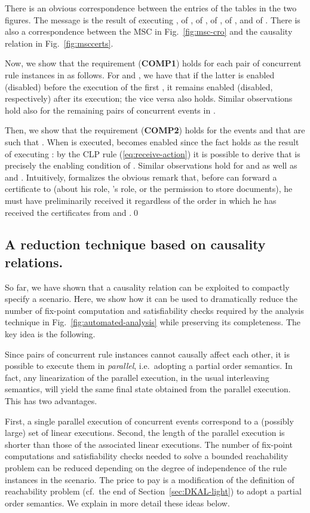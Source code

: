 \documentclass[conference]{llncs}
\begin{document}
{\begin{example}
There is an obvious correspondence between
the entries of the tables in the two figures. 
The message  is the result of executing ,  of ,  of , 
of ,  of , and  of .  There is also a
correspondence between the MSC in Fig.~\ref{fig:msc-cro} and the
causality relation  in Fig.~\ref{fig:msccerts}.  

Now, we
show that the requirement (\textbf{COMP1}) holds for each pair  of
concurrent rule instances in  as follows.  For  and ,
we have that if the latter is enabled (disabled) before the execution
of the first , it remains enabled (disabled, respectively)
after its execution; the vice versa also holds.  Similar observations
hold also for the remaining pairs of concurrent events in .  

Then, we show that the requirement (\textbf{COMP2}) holds for the events  and
 that are such that .  
When  is
executed,  becomes enabled since the fact
 holds as the result
of executing : by the CLP rule (\ref{eq:receive-action})
it is possible to derive 
that is precisely the enabling condition of .  Similar observations hold for
 and  as well as  and .  Intuitively,
 formalizes the obvious remark that, before  can forward
a certificate to  (about his role, 's role, or the
permission to store documents), he must have preliminarily received it
regardless of the order in which he has received the certificates from
 and .\qed
\end{example}

\subsection{A reduction technique based on causality relations.} 

So far, we have shown that a causality relation can be exploited to compactly
specify a scenario. Here, we show how it can be used to dramatically
reduce the number of fix-point computation and satisfiability checks
required by the analysis technique in
Fig.~\ref{fig:automated-analysis} while preserving its
completeness. The key idea is the following. 

Since pairs of concurrent
rule instances cannot causally affect each other, it is possible to
execute them in \emph{parallel}, i.e.\ adopting a partial order
semantics. In fact, any linearization of the parallel execution, in
the usual interleaving semantics, will yield the same final state
obtained from the parallel execution. This has two advantages. 

First,
a single parallel execution of concurrent events correspond to a
(possibly large) set of linear executions. Second, the length of the
parallel execution is shorter than those of the associated linear
executions.  The number of fix-point computations and satisfiability
checks needed to solve a bounded reachability problem can be reduced
depending on the degree of independence of the rule instances in the
scenario. The price to pay is a modification of the definition of
reachability problem (cf.~the end of Section~\ref{sec:DKAL-light}) to
adopt a partial order semantics. We explain in more detail these ideas
below.

}
\end{document}
